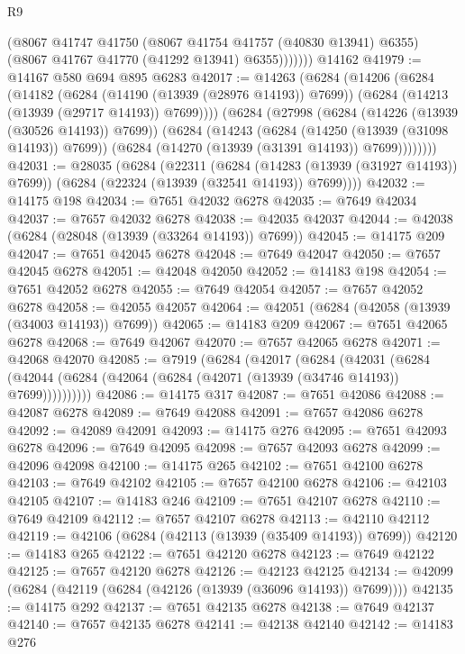 \begin{lexlean}{R9}
\begin{coremodule}
              (@8067
                @41747
                @41750
                (@8067 @41754 @41757 (@40830 @13941) @6355)
                (@8067 @41767 @41770 (@41292 @13941) @6355)))))))
    @14162
@41979 := @14167 @580 @694 @895 @6283
@42017 := @14263
    (@6284
      (@14206
        (@6284
          (@14182
            (@6284 (@14190 (@13939 (@28976 @14193)) @7699))
            (@6284 (@14213 (@13939 (@29717 @14193)) @7699))))
        (@6284
          (@27998
            (@6284 (@14226 (@13939 (@30526 @14193)) @7699))
            (@6284
              (@14243
                (@6284 (@14250 (@13939 (@31098 @14193)) @7699))
                (@6284 (@14270 (@13939 (@31391 @14193)) @7699))))))))
@42031 := @28035
    (@6284
      (@22311
        (@6284 (@14283 (@13939 (@31927 @14193)) @7699))
        (@6284 (@22324 (@13939 (@32541 @14193)) @7699))))
@42032 := @14175 @198
@42034 := @7651 @42032 @6278
@42035 := @7649 @42034
@42037 := @7657 @42032 @6278
@42038 := @42035 @42037
@42044 := @42038 (@6284 (@28048 (@13939 (@33264 @14193)) @7699))
@42045 := @14175 @209
@42047 := @7651 @42045 @6278
@42048 := @7649 @42047
@42050 := @7657 @42045 @6278
@42051 := @42048 @42050
@42052 := @14183 @198
@42054 := @7651 @42052 @6278
@42055 := @7649 @42054
@42057 := @7657 @42052 @6278
@42058 := @42055 @42057
@42064 := @42051 (@6284 (@42058 (@13939 (@34003 @14193)) @7699))
@42065 := @14183 @209
@42067 := @7651 @42065 @6278
@42068 := @7649 @42067
@42070 := @7657 @42065 @6278
@42071 := @42068 @42070
@42085 := @7919
    (@6284
      (@42017
        (@6284
          (@42031
            (@6284 (@42044 (@6284 (@42064 (@6284 (@42071 (@13939 (@34746 @14193)) @7699))))))))))
@42086 := @14175 @317
@42087 := @7651 @42086
@42088 := @42087 @6278
@42089 := @7649 @42088
@42091 := @7657 @42086 @6278
@42092 := @42089 @42091
@42093 := @14175 @276
@42095 := @7651 @42093 @6278
@42096 := @7649 @42095
@42098 := @7657 @42093 @6278
@42099 := @42096 @42098
@42100 := @14175 @265
@42102 := @7651 @42100 @6278
@42103 := @7649 @42102
@42105 := @7657 @42100 @6278
@42106 := @42103 @42105
@42107 := @14183 @246
@42109 := @7651 @42107 @6278
@42110 := @7649 @42109
@42112 := @7657 @42107 @6278
@42113 := @42110 @42112
@42119 := @42106 (@6284 (@42113 (@13939 (@35409 @14193)) @7699))
@42120 := @14183 @265
@42122 := @7651 @42120 @6278
@42123 := @7649 @42122
@42125 := @7657 @42120 @6278
@42126 := @42123 @42125
@42134 := @42099 (@6284 (@42119 (@6284 (@42126 (@13939 (@36096 @14193)) @7699))))
@42135 := @14175 @292
@42137 := @7651 @42135 @6278
@42138 := @7649 @42137
@42140 := @7657 @42135 @6278
@42141 := @42138 @42140
@42142 := @14183 @276

\end{coremodule}
\end{lexlean}
